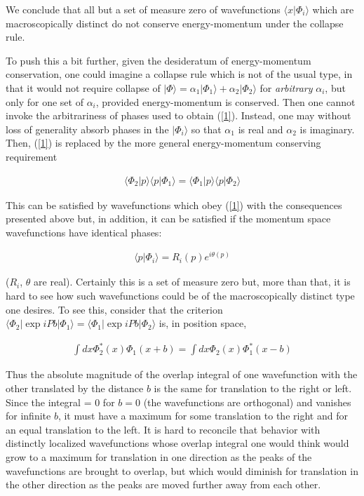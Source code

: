 \documentclass{article}
\begin{document}
	We conclude that all but a set of measure zero of 
wavefunctions $\langle x|\Phi_{i }\rangle$ which are macroscopically distinct 
do not conserve energy-momentum under the collapse rule. 

	To push this a bit further, given the desideratum of energy-momentum conservation, one could imagine 
a collapse rule which is not of the usual type, in that it would not require collapse of 
$|\Phi\rangle=\alpha_{1}|\Phi_{1}\rangle +\alpha_{2}|\Phi_{2}\rangle$ for {\it arbitrary} $\alpha_{i}$, but
 only for one set of $\alpha_{i}$, provided energy-momentum is conserved.  Then one cannot invoke the 
 arbitrariness of phases used to obtain (\ref{1}).  Instead, one may without loss of generality absorb phases 
 in the $|\Phi_{i}\rangle$ so that $\alpha_{1}$ is real and $\alpha_{2}$ is imaginary.  Then, (\ref{1}) is 
 replaced by the more general energy-momentum conserving requirement
 
\begin{eqnarray*}
 \langle \Phi_{2}|p\rangle\langle p|\Phi_{1}\rangle =\langle \Phi_{1}|p\rangle\langle p|\Phi_{2}\rangle 
\end{eqnarray*}

\noindent This can be satisfied by wavefunctions which obey (\ref{1}) with the consequences presented above  
but, in addition, it can be satisfied if the momentum space wavefunctions have identical phases: 

 \begin{eqnarray*}
\langle p|\Phi_{i}\rangle = R_{i}(p)e^{i\theta (p)}
\end{eqnarray*}

\noindent ($R_{i}$, $\theta$  are real).  Certainly this is a set of measure zero but,  
more than that, it is hard to see how such wavefunctions could be of the macroscopically distinct type 
one desires.  To see this, consider that the criterion $\langle \Phi_{2}|\exp iPb|\Phi_{1}\rangle=
\langle \Phi_{1}|\exp iPb|\Phi_{2}\rangle$ is, in position space, 

\begin{eqnarray*}
\int dx\Phi_{2}^{*}(x) \Phi_{1}(x+b) = \int dx\Phi_{2}(x) \Phi_{1}^{*}(x-b)
\end{eqnarray*}

\noindent Thus the absolute magnitude of the overlap integral of one wavefunction with 
the other translated by the distance $b$ is the same for translation to the right or left.  
Since the integral = 0 for $b=0$ (the wavefunctions are orthogonal) 
and vanishes for infinite $b$, it must have a maximum 
for some translation to the right and for an equal translation to the left.  It is hard to reconcile that 
behavior with distinctly localized wavefunctions whose overlap integral one would think would grow to 
a maximum for translation in one direction as the peaks of the wavefunctions are brought to overlap, 
but which would diminish for translation in the other direction 
as the peaks are moved further away from each other. 
\end{document}
